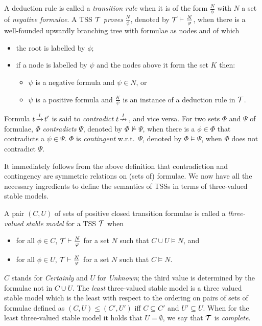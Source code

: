 \begin{definition}
A deduction rule is called a \emph{transition rule} when it is of the form $\frac{N}{\phi}$ with $N$ a set of {\em negative formulae}. A TSS $\mathcal{T}$ \emph{proves} $\frac{N}{\phi}$, denoted by $\mathcal{T} \vdash \frac{N}{\varphi}$, when there is a well-founded upwardly branching tree with formulae as nodes and of which
\begin{itemize}
\item the root is labelled by $\phi$;
\item if a node is labelled by $\psi$ and the nodes above it form the set $K$ then:
\begin{itemize}
\item $\psi$ is a negative formula and $\psi \in N$, or
\item $\psi$ is a positive formula and $\frac{K}{\psi}$ is an instance of a deduction rule in $\mathcal{T}$.
\end{itemize}
\end{itemize}
\end{definition}

\begin{definition}
Formula $t \,{\stackrel{{l}}{\rightarrow}}\, t'$ is said to \emph{contradict} $t \,{\stackrel{{l}}{\nrightarrow}}\,$, and vice versa.
For two sets $\Phi$ and $\Psi$ of formulae,
$\Phi$ \emph{contradicts} $\Psi$, denoted by $\Phi \nvDash \Psi$, when there is a $\phi \in \Phi$ that contradicts a $\psi \in \Psi$.
$\Phi$ is \emph{contingent} w.r.t.\ $\Psi$, denoted by $\Phi \vDash \Psi$, when $\Phi$ does not contradict $\Psi$.
\end{definition}

It immediately follows from the above definition that contradiction and contingency are symmetric relations on (sets of) formulae.
We now have all the necessary ingredients to define the semantics of TSSs in terms of three-valued stable models.

\begin{definition}
A pair $(C, U)$ of sets of positive closed transition formulae is called a \emph{three-valued stable model} for a TSS $\mathcal{T}$ when
\begin{itemize}
\item  for all $\phi \in C$, $\mathcal{T} \vdash \frac{N}{\varphi}$ for a set $N$ such that $C \cup U \vDash N$, and
\item  for all $\phi \in U$, $\mathcal{T} \vdash \frac{N}{\varphi}$ for a set $N$ such that $C \vDash N$.
\end{itemize}
$C$ stands for {\em Certainly} and $U$ for {\em Unknown}; the third value is determined by the formulae not in $C \cup U$.
The \emph{least} three-valued stable model is a three valued stable model which is the least with respect to the ordering on
pairs of sets of formulae defined as $(C,U) \leq (C', U')$ iff $C \subseteq C'$ and $U' \subseteq U$.
When for the least three-valued stable model it holds that $U=\emptyset$, we say that $\mathcal{T}$ is \emph{complete}.
\end{definition}



